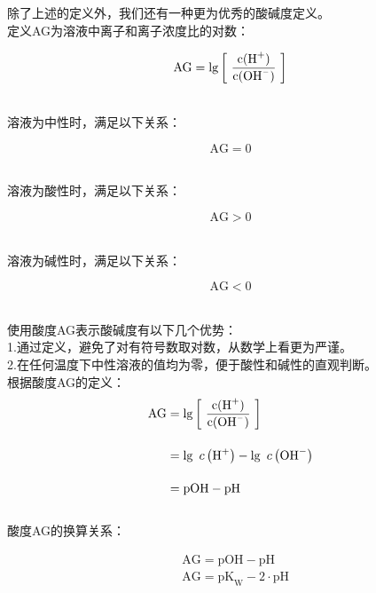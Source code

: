 \documentclass[UTF8]{ctexart}
\begin{document}
\newpage

    除了上述的定义外，我们还有一种更为优秀的酸碱度定义。\\[4mm]
    定义AG为溶液中离子和离子浓度比的对数：\vspace{5pt}
    \begin{large}
        \begin{equation*}
            \text{AG}=\lg\left[~\frac{\text{c(\ce{H+})}}{\text{c(\ce{OH-})}}~\right]
        \end{equation*}
    \end{large}\\
    溶液为中性时，满足以下关系：
    \begin{large}
        \begin{equation*}
            \text{AG}=0
        \end{equation*}
    \end{large}\\
    溶液为酸性时，满足以下关系：
    \begin{large}
        \begin{equation*}
            \text{AG}>0
        \end{equation*}
    \end{large}\\
    溶液为碱性时，满足以下关系：
    \begin{large}
        \begin{equation*}
            \text{AG}<0
        \end{equation*}
    \end{large}\\
    使用酸度AG表示酸碱度有以下几个优势：\\[3mm]
    1.通过定义，避免了对有符号数取对数，从数学上看更为严谨。\\[3mm]
    2.在任何温度下中性溶液的值均为零，便于酸性和碱性的直观判断。\\[6mm]
    根据酸度AG的定义：
    \setcounter{equation}{0}
    \begin{align}
        \text{AG}
        &=\lg\left[~\frac{\text{c(\ce{H+})}}{\text{c(\ce{OH-})}}~\right]\\[4mm]
        &=\lg~c\left(\ce{H+}\right)-\lg~c\left(\ce{OH-}\right)\\[4mm]
        &=\text{pOH}-\text{pH}
    \end{align}\\
    酸度AG的换算关系：
    \begin{large}
        \begin{align*}
            &\text{AG}=\text{pOH}-\text{pH}\\[3mm]
            &\text{AG}=\text{pK}_\text{W}-2\cdot\text{pH}\\[3mm]
        \end{align*}
    \end{large}
\end{document}
